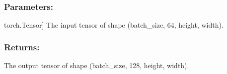 \documentclass[a4paper,10pt,english]{sphinxmanual}
\begin{document}
\begin{fulllineitems}
\begin{fulllineitems}
\subsubsection{Parameters:}
\label{\detokenize{models:id1}}\begin{description}
\sphinxlineitem{x}{[}torch.Tensor{]}
\sphinxAtStartPar
The input tensor of shape (batch\_size, 64, height, width).

\end{description}


\subsubsection{Returns:}
\label{\detokenize{models:id2}}\begin{description}
\sphinxAtStartPar
The output tensor of shape (batch\_size, 128, height, width).

\end{description}

\end{fulllineitems}


\end{fulllineitems}

\end{document}
